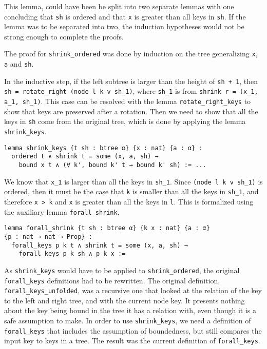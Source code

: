 This lemma, could have been be split into two separate lemmas with one concluding that \lstinline{sh} is ordered and that \lstinline{x} is greater than all keys in \lstinline{sh}. If the lemma was to be separated into two, the induction hypotheses would not be strong enough to complete the proofs.

The proof for \lstinline{shrink_ordered} was done by induction on the tree generalizing \lstinline{x}, \lstinline{a} and \lstinline{sh}.

In the inductive step, if the left subtree is larger than the height of \lstinline{sh + 1}, then \lstinline{sh = rotate_right (node l k v sh_1)}, where \lstinline{sh_1} is from \lstinline{shrink r = (x_1, a_1, sh_1)}. This case can be resolved with the lemma \lstinline{rotate_right_keys} to show that keys are preserved after a rotation. Then we need to show that all the keys in \lstinline{sh} come from the original tree, which is done by applying the lemma \lstinline{shrink_keys}.

\begin{lstlisting}
lemma shrink_keys {t sh : btree α} {x : nat} {a : α} :
  ordered t ∧ shrink t = some (x, a, sh) → 
    bound x t ∧ (∀ k', bound k' t → bound k' sh) := ...
\end{lstlisting}

We know that \lstinline{x_1} is larger than all the keys in \lstinline{sh_1}. Since \lstinline{(node l k v sh_1)} is ordered, then it must be the case that \lstinline{k} is smaller than all the keys in \lstinline{sh_1}, and therefore \lstinline{x > k} and \lstinline{x} is greater than all the keys in \lstinline{l}. This is formalized using the auxiliary lemma \lstinline{forall_shrink}.

\begin{lstlisting}
lemma forall_shrink {t sh : btree α} {k x : nat} {a : α} 
{p : nat → nat → Prop} :
  forall_keys p k t ∧ shrink t = some (x, a, sh) → 
    forall_keys p k sh ∧ p k x :=
\end{lstlisting}

As \lstinline{shrink_keys} would have to be applied to \lstinline{shrink_ordered}, the original \lstinline{forall_keys} definitions had to be rewritten. The original definition, \lstinline{forall_keys_unfolded}, was a recursive one that looked at the relation of the key to the left and right tree, and with the current node key. It presents nothing about the key being bound in the tree it has a relation with, even though it is a safe assumption to make. In order to use \lstinline{shrink_keys}, we need a definition of \lstinline{forall_keys} that includes the assumption of boundedness, but still compares the input key to keys in a tree. The result was the current definition of \lstinline{forall_keys}.

